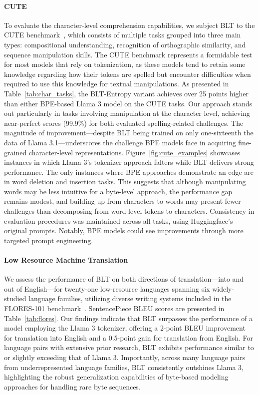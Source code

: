 \paragraph{CUTE}
To evaluate the character-level comprehension capabilities, we subject {\textsc BLT} to the CUTE benchmark~\citep{edman2024cute}, which consists of multiple tasks grouped into three main types: compositional understanding, recognition of orthographic similarity, and sequence manipulation skills. The CUTE benchmark represents a formidable test for most models that rely on tokenization, as these models tend to retain some knowledge regarding how their tokens are spelled but encounter difficulties when required to use this knowledge for textual manipulations. As presented in Table~\ref{tab:char_tasks}, the {\textsc BLT}-Entropy variant achieves over 25 points higher than either BPE-based Llama 3 model on the CUTE tasks. Our approach stands out particularly in tasks involving manipulation at the character level, achieving near-perfect scores (99.9\%) for both evaluated spelling-related challenges. The magnitude of improvement—despite {\textsc BLT} being trained on only one-sixteenth the data of Llama 3.1—underscores the challenge BPE models face in acquiring fine-grained character-level representations. Figure~\ref{fig:cute_examples} showcases instances in which Llama 3’s tokenizer approach falters while {\textsc BLT} delivers strong performance. The only instances where BPE approaches demonstrate an edge are in word deletion and insertion tasks. This suggests that although manipulating words may be less intuitive for a byte-level approach, the performance gap remains modest, and building up from characters to words may present fewer challenges than decomposing from word-level tokens to characters. Consistency in evaluation procedures was maintained across all tasks, using Huggingface’s original prompts. Notably, BPE models could see improvements through more targeted prompt engineering.

\paragraph{Low Resource Machine Translation} We assess the performance of {\textsc BLT} on both directions of translation—into and out of English—for twenty-one low-resource languages spanning six widely-studied language families, utilizing diverse writing systems included in the FLORES-101 benchmark~\citep{goyal2022flores}. SentencePiece BLEU scores are presented in Table~\ref{tab:flores}. Our findings indicate that {\textsc BLT} surpasses the performance of a model employing the Llama 3 tokenizer, offering a 2-point BLEU improvement for translation into English and a 0.5-point gain for translation from English. For language pairs with extensive prior research, {\textsc BLT} exhibits performance similar to or slightly exceeding that of Llama 3. Importantly, across many language pairs from underrepresented language families, {\textsc BLT} consistently outshines Llama 3, highlighting the robust generalization capabilities of byte-based modeling approaches for handling rare byte sequences.

